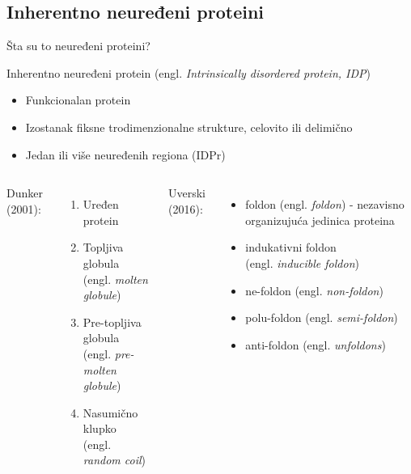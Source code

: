 \documentclass{beamer}
\newcommand{\en}[1]{(engl. \textit{#1})}
\begin{document}
\subsection{Inherentno neuređeni proteini}
\begin{frame} {Šta su to neuređeni proteini?}

  Inherentno neuređeni protein \en{Intrinsically disordered protein, IDP}
  \begin{itemize}
    \item Funkcionalan protein
    \item Izostanak fiksne trodimenzionalne strukture, celovito ili delimično 
    \item Jedan ili više neuređenih regiona (IDPr)
  \end{itemize}

  \begin{columns}
    Dunker (2001):
    \begin{enumerate} \small
      \item Uređen protein 
      \item Topljiva globula\\ \en{molten globule} 
      \item Pre-topljiva globula \\\en{pre-molten globule} 
      \item Nasumično klupko \\\en{random coil} 
    \end{enumerate}

    Uverski (2016):
    \begin{itemize} \small
      \item foldon \en{foldon} - nezavisno organizujuća jedinica proteina
      \item indukativni foldon \\\en{inducible foldon} 
      \item ne-foldon \en{non-foldon} 
      \item polu-foldon \en{semi-foldon} 
      \item anti-foldon \en{unfoldons} 
    \end{itemize}
  \end{columns}

\end{frame}


\end{document}

